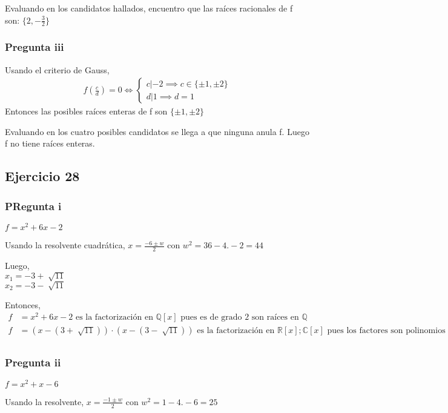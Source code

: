 Evaluando en los candidatos hallados, encuentro que las raíces racionales de f son: $ \{ 2, -\frac{3}{2} \} $

\subsubsection{Pregunta iii}
Usando el criterio de Gauss, 
\begin{align*}
    f(\frac{c}{d}) = 0 \iff \begin{cases}
        c|-2 \implies c \in \{ \pm 1, \pm 2 \} \\
        d|1 \implies d = 1
    \end{cases}
\end{align*}
Entonces las posibles raíces enteras de f son $ \{ \pm 1, \pm 2 \} $

Evaluando en los cuatro posibles candidatos se llega a que ninguna anula f. Luego f no tiene raíces enteras.

\subsection{Ejercicio 28}
\subsubsection{PRegunta i}
$ f = x^2 +6x - 2 $

Usando la resolvente cuadrática, $ x = \frac{-6 \pm w }{2} $ con $ w^2 = 36-4.-2 = 44 $

Luego, \\
$ x_1 = -3 + \sqrt[]{11} $ \\
$ x_2 = -3 - \sqrt[]{11} $ 

Entonces,
\begin{align*}
    f &= x^2 + 6x - 2 \text{ es la factorización en } \mathbb{Q}[x] \text{ pues es de grado 2 son raíces en } \mathbb{Q} \\
    f &= (x-(3+\sqrt[]{11})) \cdot (x-(3-\sqrt[]{11})) \text{ es la factorización en } \mathbb{R}[x]; \mathbb{C}[x] \text{ pues los factores son polinomios irred de gr 1} \\
\end{align*}
\subsubsection{Pregunta ii}
$ f = x^2 + x - 6 $

Usando la resolvente, $ x = \frac{-1 \pm w}{2} $ con $ w^2 = 1-4.-6 = 25 $

